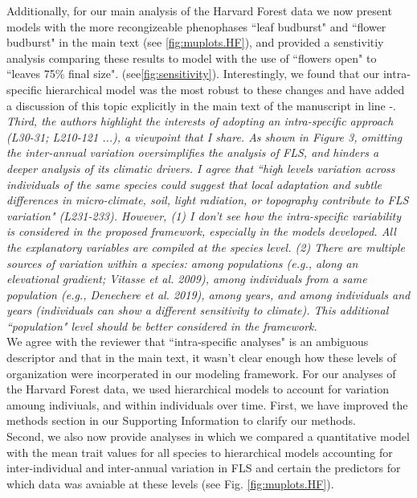 \documentclass{article}[11pt]
\begin{document}
\noindent Additionally, for our main analysis of the Harvard Forest data we now present models with the more recongizeable phenophases ``leaf budburst" and ``flower budburst" in the main text (see \ref{fig:muplots.HF}), and provided a senstivitiy analysis comparing these results to model with the use of ``flowers open" to ``leaves 75\% final size". (see\ref{fig:sensitivity}). Interestingly, we found that our intra-specific hierarchical model was the most robust to these changes and have added a discussion of this topic explicitly in the main text of the manuscript in line -.\\  


\emph{Third, the authors highlight the interests of adopting an intra-specific approach (L30-31; L210-121 ...), a viewpoint that I share. As shown in Figure 3, omitting the inter-annual variation oversimplifies the analysis of FLS, and hinders a deeper analysis of its climatic drivers. I agree that ``high levels variation across individuals of the same species could suggest that local adaptation and subtle differences in micro-climate, soil, light radiation, or topography contribute to FLS variation" (L231-233). However, (1) I don't see how the intra-specific variability is considered in the proposed framework, especially in the models developed. All the explanatory variables are compiled at the species level. (2) There are multiple sources of variation within a species: among populations (e.g., along an elevational gradient; Vitasse et al. 2009), among individuals from a same population (e.g., Denechere et al. 2019), among years, and among individuals and years (individuals can show a different sensitivity to climate). This additional ``population" level should be better considered in the framework.}\\

\noindent We agree with the reviewer that ``intra-specific analyses" is an ambiguous descriptor and that in the main text, it wasn't clear enough how these levels of organization were incorperated in our modeling framework. For our analyses of the Harvard Forest data, we used hierarchical models to account for variation amoung indiviuals, and within individuals over time. First, we have improved the methods section in our Supporting Information to clarify our methods.\\ 

\noindent Second, we also now provide analyses in which we compared a quantitative model with the mean trait values for all species to hierarchical models accounting for inter-individual and inter-annual variation in FLS and certain the predictors for which data was avaiable at these levels (see Fig.  \ref{fig:muplots.HF}).\\
\end{document}
